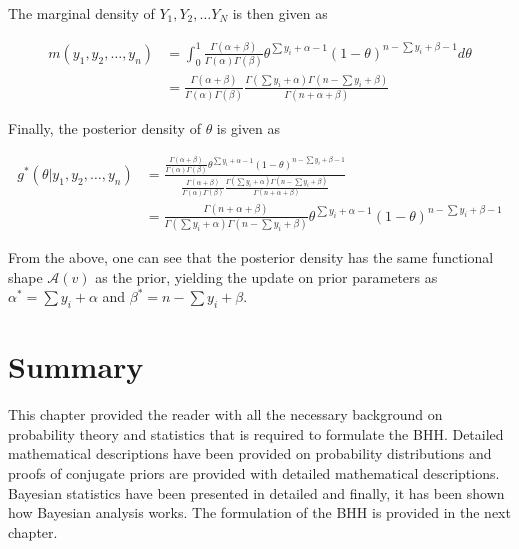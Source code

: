 The marginal density of $Y_{1}, Y_{2}, \dots Y_{N}$ is then given as

\begin{equation*}
    \begin{split}
        m(y_{1}, y_{2}, \dots, y_{n})
        &= \int_{0}^{1}\frac{\Gamma(\alpha + \beta)}{\Gamma(\alpha)\Gamma(\beta)}\theta^{\sum y_{i} + \alpha - 1}(1-\theta)^{n - \sum y_{i} + \beta - 1}d\theta\\
        &= \frac{\Gamma(\alpha + \beta)}{\Gamma(\alpha)\Gamma(\beta)}\frac{\Gamma(\sum y_{i} + \alpha)\Gamma(n - \sum y_{i} + \beta)}{\Gamma(n + \alpha + \beta)}
    \end{split}
\end{equation*}

Finally, the posterior density of $\theta$ is given as

\begin{equation*}
    \begin{split}
        g^{*}(\theta \vert y_{1}, y_{2}, \dots, y_{n})
        &= \frac{\frac{\Gamma(\alpha + \beta)}{\Gamma(\alpha)\Gamma(\beta)}\theta^{\sum y_{i} + \alpha - 1}(1-\theta)^{n - \sum y_{i} + \beta - 1}}{\frac{\Gamma(\alpha + \beta)}{\Gamma(\alpha)\Gamma(\beta)}\frac{\Gamma(\sum y_{i} + \alpha)\Gamma(n - \sum y_{i} + \beta)}{\Gamma(n + \alpha + \beta)}}\\
        &= \frac{\Gamma(n + \alpha + \beta)}{\Gamma(\sum y_{i} + \alpha)\Gamma(n - \sum y_{i} + \beta)}\theta^{\sum y_{i} + \alpha - 1}(1-\theta)^{n - \sum y_{i} + \beta - 1}
    \end{split}
\end{equation*}

From the above, one can see that the posterior density has the same functional shape $\mathcal{A}(v)$ as the prior, yielding the update on prior parameters as $\alpha^{*} = \sum y_{i} + \alpha$ and $\beta^{*} = n - \sum y_{i} + \beta$.

\section{Summary}
\label{sec:probability:summary}

This chapter provided the reader with all the necessary background on probability theory and statistics that is required to formulate the \ac{BHH}. Detailed mathematical descriptions have been provided on probability distributions and proofs of conjugate priors are provided with detailed mathematical descriptions. Bayesian statistics have been presented in detailed and finally, it has been shown how Bayesian analysis works. The formulation of the \ac{BHH} is provided in the next chapter.